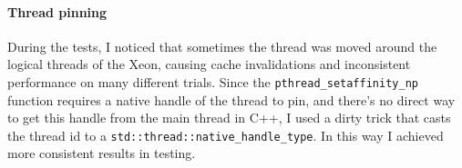 \paragraph{Thread pinning}
During the tests, I noticed that sometimes the thread was moved around the logical threads of the Xeon, causing cache invalidations and inconsistent performance on many different trials. Since the \texttt{pthread\_setaffinity\_np} function requires a native handle of the thread to pin, and there's no direct way to get this handle from the main thread in C++, I used a dirty trick that casts the thread id to a \texttt{std::thread::native\_handle\_type}. In this way I achieved more consistent results in testing.
